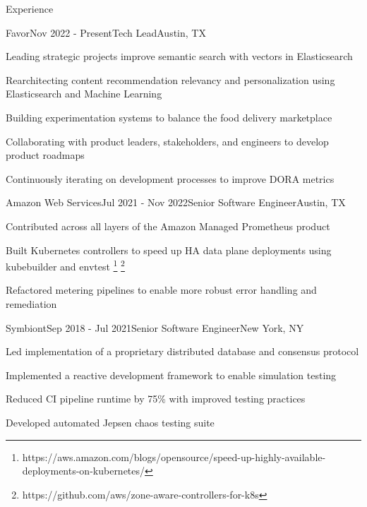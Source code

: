 \documentclass[
	11pt, %
]{resume} %
\begin{document}
\begin{rSection}{Experience}

	\begin{rSubsection}{Favor}{Nov 2022 - Present}{Tech Lead}{Austin, TX}
        \item Leading strategic projects improve semantic search with vectors in Elasticsearch
        \item Rearchitecting content recommendation relevancy and personalization using Elasticsearch and Machine Learning
        \item Building experimentation systems to balance the food delivery marketplace
        \item Collaborating with product leaders, stakeholders, and engineers to develop product roadmaps
        \item Continuously iterating on development processes to improve DORA metrics
	\end{rSubsection}


    \begin{rSubsection}{Amazon Web Services}{Jul 2021 - Nov 2022}{Senior Software Engineer}{Austin, TX}
        \item Contributed across all layers of the Amazon Managed Prometheus product
        \item Built Kubernetes controllers to speed up HA data plane deployments using kubebuilder and envtest \footnote{https://aws.amazon.com/blogs/opensource/speed-up-highly-available-deployments-on-kubernetes/} \footnote{https://github.com/aws/zone-aware-controllers-for-k8s}
        \item Refactored metering pipelines to enable more robust error handling and remediation
    \end{rSubsection}

    \begin{rSubsection}{Symbiont}{Sep 2018 - Jul 2021}{Senior Software Engineer}{New York, NY}
        \item Led implementation of a proprietary distributed database and consensus protocol
        \item Implemented a reactive development framework to enable simulation testing
        \item Reduced CI pipeline runtime by 75\% with improved testing practices
        \item Developed automated Jepsen chaos testing suite
    \end{rSubsection}


\end{rSection}
\end{document}
